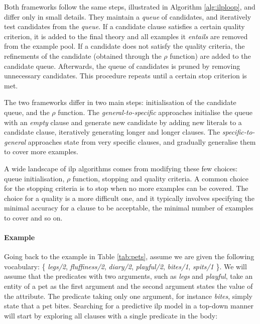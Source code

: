 Both frameworks follow the same steps, illustrated in Algorithm \ref{alg:ilploop}, and differ only in small details.
They maintain a \textit{queue} of candidates, and iteratively test candidates from the \textit{queue}.
If a candidate clause satisfies a certain quality criterion, it is added to the final theory and all examples it \textit{entails} are removed from the example pool.
If a candidate does not satisfy the quality criteria, the refinements of the candidate (obtained through the $\rho$ function) are added to the candidate queue.
Afterwards, the queue of candidates is pruned by removing unnecessary candidates.
This procedure repeats until a certain stop criterion is met.



The two frameworks differ in two main steps: initialisation of the candidate queue, and the $\rho$ function.
The \textit{general-to-specific} approaches initialise the queue with an \textit{empty} clause and generate new candidate by adding new literals to a candidate clause, iteratively generating longer and longer clauses.
The \textit{specific-to-general} approaches state from very specific clauses, and gradually generalise them to cover more examples.




A wide landscape of \gls{ilp} algorithms comes from modifying these few choices: queue initialisation, $\rho$ function, stopping and quality criteria.
A common choice for the stopping criteria is to stop when no more examples can be covered.
The choice for a quality is a more difficult one, and it typically involves specifying the minimal accuracy for a clause to be acceptable, the minimal number of examples to cover and so on.




\paragraph{\textbf{Example}}
Going back to the example in Table \ref{tab:pets}, assume we are given the following vocabulary: \{ \textit{legs/2}, \textit{fluffiness/2}, \textit{diary/2}, \textit{playful/2}, \textit{bites/1}, \textit{spits/1} \}.
We will assume that the predicates with two arguments, such as \textit{legs} and \textit{playful}, take an entity of a pet as the first argument and the second argument states the value of the attribute.
The predicate taking only one argument, for instance \textit{bites}, simply state that a pet bites.
Searching for a predictive \gls{ilp} model in a top-down manner will start by exploring all clauses with a single predicate in the body:

